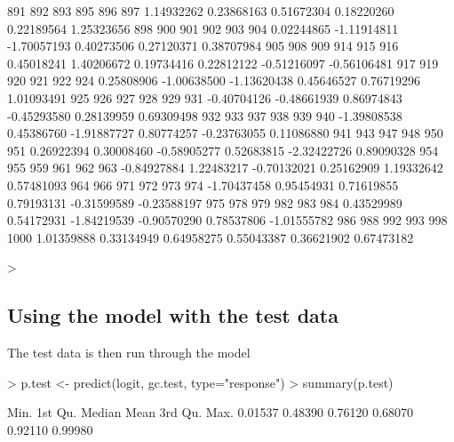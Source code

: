 \documentclass{article}
\begin{document}
\begin{Schunk}
\begin{Soutput}
        891         892         893         895         896         897 
 1.14932262  0.23868163  0.51672304  0.18220260  0.22189564  1.25323656 
        898         900         901         902         903         904 
 0.02244865 -1.11914811 -1.70057193  0.40273506  0.27120371  0.38707984 
        905         908         909         914         915         916 
 0.45018241  1.40206672  0.19734416  0.22812122 -0.51216097 -0.56106481 
        917         919         920         921         922         924 
 0.25808906 -1.00638500 -1.13620438  0.45646527  0.76719296  1.01093491 
        925         926         927         928         929         931 
-0.40704126 -0.48661939  0.86974843 -0.45293580  0.28139959  0.69309498 
        932         933         937         938         939         940 
-1.39808538  0.45386760 -1.91887727  0.80774257 -0.23763055  0.11086880 
        941         943         947         948         950         951 
 0.26922394  0.30008460 -0.58905277  0.52683815 -2.32422726  0.89090328 
        954         955         959         961         962         963 
-0.84927884  1.22483217 -0.70132021  0.25162909  1.19332642  0.57481093 
        964         966         971         972         973         974 
-1.70437458  0.95454931  0.71619855  0.79193131 -0.31599589 -0.23588197 
        975         978         979         982         983         984 
 0.43529989  0.54172931 -1.84219539 -0.90570290  0.78537806 -1.01555782 
        986         988         992         993         998        1000 
 1.01359888  0.33134949  0.64958275  0.55043387  0.36621902  0.67473182 
\end{Soutput}
\begin{Sinput}
> 
\end{Sinput}
\end{Schunk}

\subsection*{Using the model with the test data}
The test data is then run through the model
\begin{Schunk}
\begin{Sinput}
> p.test <- predict(logit, gc.test, type="response")
> summary(p.test)
\end{Sinput}
\begin{Soutput}
   Min. 1st Qu.  Median    Mean 3rd Qu.    Max. 
0.01537 0.48390 0.76120 0.68070 0.92110 0.99980 
\end{Soutput}
\end{Schunk}
\end{document}
